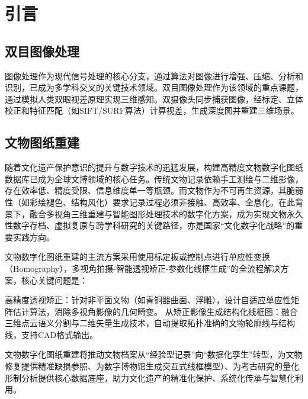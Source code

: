 \documentclass{article}
\begin{document}

\newpage
\pagestyle{plain}
\tableofcontents


\newpage
\pagestyle{fancy}
\fancyhf{}               %
\renewcommand{\headrulewidth}{0pt} %
 \setcounter{page}{1} %

\section{引言}
\subsection{双目图像处理}

图像处理作为现代信号处理的核心分支，通过算法对图像进行增强、压缩、分析和识别，已成为多学科交叉的关键技术领域。双目图像处理作为该领域的重点课题，通过模拟人类双眼视差原理实现三维感知。双摄像头同步捕获图像，经标定、立体校正和特征匹配（如SIFT/SURF算法）计算视差，生成深度图并重建三维场景。

\subsection{文物图纸重建}
随着文化遗产保护意识的提升与数字技术的迅猛发展，构建高精度文物数字化图纸数据库已成为全球文博领域的核心任务。传统文物记录依赖手工测绘与二维影像，存在效率低、精度受限、信息维度单一等瓶颈。而文物作为不可再生资源，其脆弱性（如彩绘褪色、结构风化）要求记录过程必须非接触、高效率、全息化。在此背景下，融合多视角三维重建与智能图形处理技术的数字化方案，成为实现文物永久性数字存档、虚拟复原与跨学科研究的关键路径，亦是国家“文化数字化战略”的重要实践方向。


文物数字化图纸重建的主流方案采用使用标定板或控制点进行单应性变换（Homography），多视角拍摄-智能透视矫正-参数化线框生成”的全流程解决方案，核心关键问题是：

高精度透视矫正​​：针对非平面文物​（如青铜器曲面、浮雕），设计自适应单应性矩阵估计算法，消除多视角影像的几何畸变。
从矫正影像生成结构化线框图：融合三维点云语义分割与二维矢量生成技术，自动提取拓扑准确的文物轮廓线与结构线，支持CAD格式输出。


文物数字化图纸重建将推动文物档案从“经验型记录”向“数据化孪生”转型，为文物修复提供精准缺损参照、为数字博物馆生成交互式线框模型）、为考古研究的量化形制分析提供核心数据底座，助力文化遗产的精准化保护、系统化传承与智慧化利用。
\end{document}
